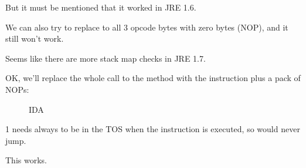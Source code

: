 But it must be mentioned that it worked in JRE 1.6.

We can also try to replace to all 3  opcode bytes with zero bytes (\ac{NOP}), 
and it still won't work.

Seems like there are more stack map checks in JRE 1.7.


OK, we'll replace the whole call to the  method with the  instruction 
plus a pack of \ac{NOP}s:


\begin{figure}[H]
\centering
{}
\caption{IDA}
\end{figure}

1 needs always to be in the \ac{TOS} when the  instruction is executed, 
so  would never jump.


This works.
